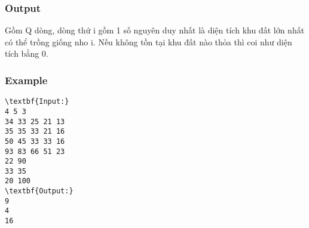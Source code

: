 \subsubsection{Output}

Gồm Q dòng, dòng thứ i gồm 1 số nguyên duy nhất là diện tích khu đất lớn nhất có thể trồng giống nho i. Nếu không tồn tại khu đất nào thỏa thì coi như diện tích bằng 0.

\subsubsection{Example}
\begin{verbatim}
\textbf{Input:}
4 5 3
34 33 25 21 13
35 35 33 21 16
50 45 33 33 16
93 83 66 51 23
22 90
33 35
20 100
\textbf{Output:}
9
4
16\end{verbatim}